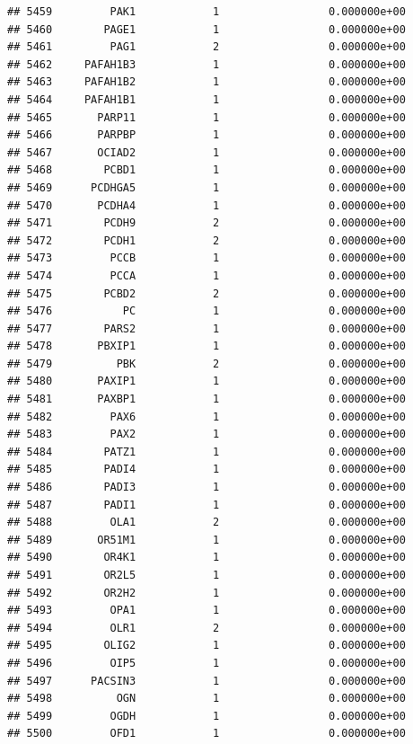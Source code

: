 \documentclass[
]{article}
\begin{document}
\begin{verbatim}
## 5459         PAK1            1                 0.000000e+00
## 5460        PAGE1            1                 0.000000e+00
## 5461         PAG1            2                 0.000000e+00
## 5462     PAFAH1B3            1                 0.000000e+00
## 5463     PAFAH1B2            1                 0.000000e+00
## 5464     PAFAH1B1            1                 0.000000e+00
## 5465       PARP11            1                 0.000000e+00
## 5466       PARPBP            1                 0.000000e+00
## 5467       OCIAD2            1                 0.000000e+00
## 5468        PCBD1            1                 0.000000e+00
## 5469      PCDHGA5            1                 0.000000e+00
## 5470       PCDHA4            1                 0.000000e+00
## 5471        PCDH9            2                 0.000000e+00
## 5472        PCDH1            2                 0.000000e+00
## 5473         PCCB            1                 0.000000e+00
## 5474         PCCA            1                 0.000000e+00
## 5475        PCBD2            2                 0.000000e+00
## 5476           PC            1                 0.000000e+00
## 5477        PARS2            1                 0.000000e+00
## 5478       PBXIP1            1                 0.000000e+00
## 5479          PBK            2                 0.000000e+00
## 5480       PAXIP1            1                 0.000000e+00
## 5481       PAXBP1            1                 0.000000e+00
## 5482         PAX6            1                 0.000000e+00
## 5483         PAX2            1                 0.000000e+00
## 5484        PATZ1            1                 0.000000e+00
## 5485        PADI4            1                 0.000000e+00
## 5486        PADI3            1                 0.000000e+00
## 5487        PADI1            1                 0.000000e+00
## 5488         OLA1            2                 0.000000e+00
## 5489       OR51M1            1                 0.000000e+00
## 5490        OR4K1            1                 0.000000e+00
## 5491        OR2L5            1                 0.000000e+00
## 5492        OR2H2            1                 0.000000e+00
## 5493         OPA1            1                 0.000000e+00
## 5494         OLR1            2                 0.000000e+00
## 5495        OLIG2            1                 0.000000e+00
## 5496         OIP5            1                 0.000000e+00
## 5497      PACSIN3            1                 0.000000e+00
## 5498          OGN            1                 0.000000e+00
## 5499         OGDH            1                 0.000000e+00
## 5500         OFD1            1                 0.000000e+00

\end{verbatim}
\end{document}
